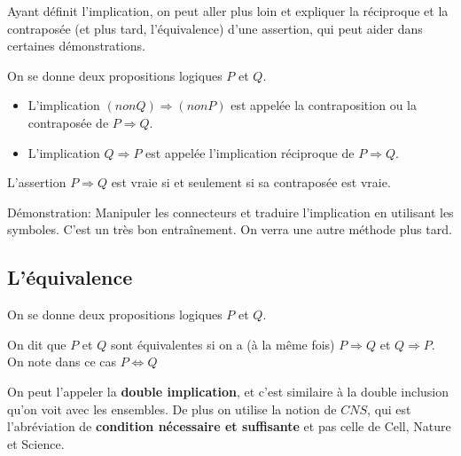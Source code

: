 \documentclass{article}
\begin{document}
Ayant définit l'implication, on peut aller plus loin et expliquer la réciproque et la contraposée (et plus tard, l'équivalence) d'une assertion, qui peut aider dans certaines démonstrations.

\begin{tcolorbox}[colback=red!5!white,colframe=red!75!black,title=Définition 1.9]

On se donne deux propositions logiques $P$ et $Q$. 

\begin{itemize}
 \item L’implication $(non Q) \Rightarrow (non P)$ est appelée la contraposition ou la contraposée de $P \Rightarrow Q$.
 \item L’implication $Q \Rightarrow P$ est appelée l’implication réciproque de $P \Rightarrow Q$.
\end{itemize}
 

 
\end{tcolorbox}

 \begin{tcolorbox}[colback=blue!5!white,colframe=blue!75!black,title=Propriété 1.2.1]

L'assertion $P \Rightarrow Q$ est vraie si et seulement si sa contraposée est vraie.

\tcblower

Démonstration: Manipuler les connecteurs et traduire l'implication en utilisant les symboles. C'est un très bon entraînement. On verra une autre méthode plus tard.


\end{tcolorbox}

\subsection{L'équivalence}

\begin{tcolorbox}[colback=red!5!white,colframe=red!75!black,title=Définition 1.10]

On se donne deux propositions logiques $P$ et $Q$. 

On dit que $P$ et $Q$ sont équivalentes si on a (à la même fois) $P \Rightarrow Q$ et $Q \Rightarrow P$. On note dans ce cas $P \Leftrightarrow Q$



\end{tcolorbox}

On peut l'appeler la \textbf{double implication}, et c'est similaire à la double inclusion qu'on voit avec les ensembles. De plus on utilise la notion de $CNS$, qui est l'abréviation de \textbf{condition nécessaire et suffisante} et pas celle de Cell, Nature et Science.
\end{document}
